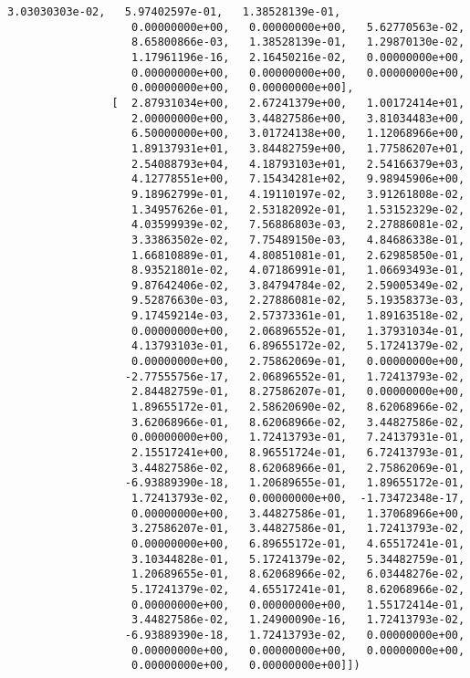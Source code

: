 \documentclass[11pt]{article}
\begin{document}
\begin{Verbatim}[commandchars=\\\{\}]
                   3.03030303e-02,   5.97402597e-01,   1.38528139e-01,
                   0.00000000e+00,   0.00000000e+00,   5.62770563e-02,
                   8.65800866e-03,   1.38528139e-01,   1.29870130e-02,
                   1.17961196e-16,   2.16450216e-02,   0.00000000e+00,
                   0.00000000e+00,   0.00000000e+00,   0.00000000e+00,
                   0.00000000e+00,   0.00000000e+00],
                [  2.87931034e+00,   2.67241379e+00,   1.00172414e+01,
                   2.00000000e+00,   3.44827586e+00,   3.81034483e+00,
                   6.50000000e+00,   3.01724138e+00,   1.12068966e+00,
                   1.89137931e+01,   3.84482759e+00,   1.77586207e+01,
                   2.54088793e+04,   4.18793103e+01,   2.54166379e+03,
                   4.12778551e+00,   7.15434281e+02,   9.98945906e+00,
                   9.18962799e-01,   4.19110197e-02,   3.91261808e-02,
                   1.34957626e-01,   2.53182092e-01,   1.53152329e-02,
                   4.03599939e-02,   7.56886803e-03,   2.27886081e-02,
                   3.33863502e-02,   7.75489150e-03,   4.84686338e-01,
                   1.66810889e-01,   4.80851081e-01,   2.62985850e-01,
                   8.93521801e-02,   4.07186991e-01,   1.06693493e-01,
                   9.87642406e-02,   3.84794784e-02,   2.59005349e-02,
                   9.52876630e-03,   2.27886081e-02,   5.19358373e-03,
                   9.17459214e-03,   2.57373361e-01,   1.89163518e-02,
                   0.00000000e+00,   2.06896552e-01,   1.37931034e-01,
                   4.13793103e-01,   6.89655172e-02,   5.17241379e-02,
                   0.00000000e+00,   2.75862069e-01,   0.00000000e+00,
                  -2.77555756e-17,   2.06896552e-01,   1.72413793e-02,
                   2.84482759e-01,   8.27586207e-01,   0.00000000e+00,
                   1.89655172e-01,   2.58620690e-02,   8.62068966e-02,
                   3.62068966e-01,   8.62068966e-02,   3.44827586e-02,
                   0.00000000e+00,   1.72413793e-01,   7.24137931e-01,
                   2.15517241e+00,   8.96551724e-01,   6.72413793e-01,
                   3.44827586e-02,   8.62068966e-01,   2.75862069e-01,
                  -6.93889390e-18,   1.20689655e-01,   1.89655172e-01,
                   1.72413793e-02,   0.00000000e+00,  -1.73472348e-17,
                   0.00000000e+00,   3.44827586e-01,   1.37068966e+00,
                   3.27586207e-01,   3.44827586e-01,   1.72413793e-02,
                   0.00000000e+00,   6.89655172e-01,   4.65517241e-01,
                   3.10344828e-01,   5.17241379e-02,   5.34482759e-01,
                   1.20689655e-01,   8.62068966e-02,   6.03448276e-02,
                   5.17241379e-02,   4.65517241e-01,   8.62068966e-02,
                   0.00000000e+00,   0.00000000e+00,   1.55172414e-01,
                   3.44827586e-02,   1.24900090e-16,   1.72413793e-02,
                  -6.93889390e-18,   1.72413793e-02,   0.00000000e+00,
                   0.00000000e+00,   0.00000000e+00,   0.00000000e+00,
                   0.00000000e+00,   0.00000000e+00]])
\end{Verbatim}
            
\end{document}
